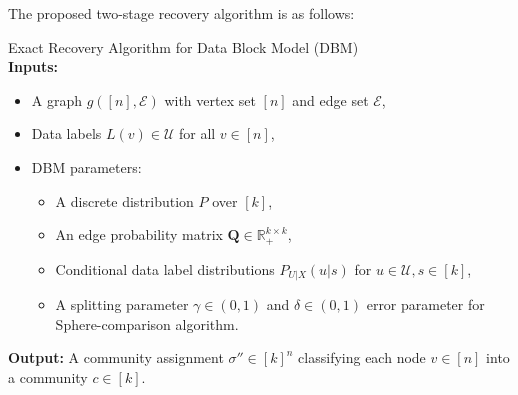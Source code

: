 \documentclass[11pt]{article}
\theoremstyle{plain}
\theoremstyle{definition}
\begin{document}
The proposed two-stage recovery algorithm is as follows:

\vspace{1ex}
\noindent
{\sc Exact Recovery Algorithm for Data Block Model  (DBM)}\\
\noindent\textbf{Inputs:}
\begin{itemize}
    \item A graph \( g([n], \mathcal{E}) \) with vertex set \([n]\) and edge set \( \mathcal{E} \),
    \item Data labels \( L(v) \in \mathcal{U} \) for all \( v \in [n] \),
    \item DBM parameters:
    \begin{itemize}
        \item A discrete distribution \( P \) over \([k] \),
        \item An edge probability matrix \( \mathbf{Q} \in \mathbb{R}_{+}^{k \times k} \),
        \item Conditional data label distributions \( P_{U|X}(u|s) \) for \( u \in \mathcal{U}, s \in [k] \),
        \item A splitting parameter \( \gamma \in (0,1) \) and \(\delta \in (0,1)\) error parameter for {\sc Sphere-comparison} algorithm.
    \end{itemize}
\end{itemize}

\noindent\textbf{Output:} A community assignment \( \sigma'' \in [k]^n \) classifying each node \( v \in [n] \) into a community \( c \in [k] \).
\end{document}
